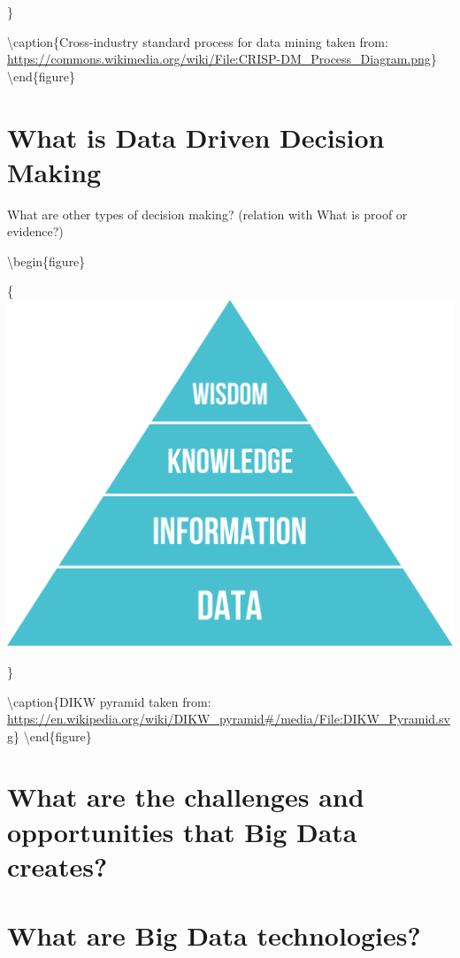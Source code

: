 \documentclass[
]{book}
\begin{document}
\}

\textbackslash caption\{Cross-industry standard process for data mining taken from: \url{https://commons.wikimedia.org/wiki/File:CRISP-DM_Process_Diagram.png}\}\label{fig:crisp-fig}
\textbackslash end\{figure\}

\hypertarget{what-is-data-driven-decision-making}{%
\section{What is Data Driven Decision Making}\label{what-is-data-driven-decision-making}}

What are other types of decision making? (relation with What is proof or evidence?)

\textbackslash begin\{figure\}

\{\centering \includegraphics[width=0.8\linewidth]{images/pyramid}

\}

\textbackslash caption\{DIKW pyramid taken from: \url{https://en.wikipedia.org/wiki/DIKW_pyramid\#/media/File:DIKW_Pyramid.svg}\}\label{fig:dikw-fig}
\textbackslash end\{figure\}

\hypertarget{what-are-the-challenges-and-opportunities-that-big-data-creates}{%
\section{What are the challenges and opportunities that Big Data creates?}\label{what-are-the-challenges-and-opportunities-that-big-data-creates}}

\hypertarget{what-are-big-data-technologies}{%
\section{What are Big Data technologies?}\label{what-are-big-data-technologies}}
\end{document}

